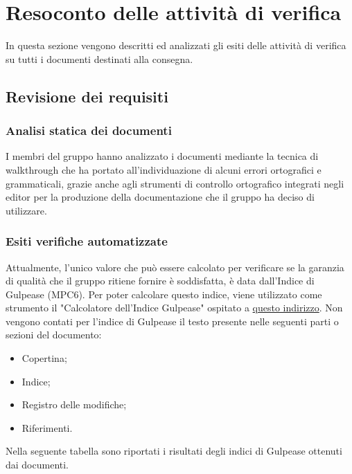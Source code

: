 \section{Resoconto delle attività di verifica}
In questa sezione vengono descritti ed analizzati gli esiti delle attività di verifica su tutti i documenti destinati alla consegna.

\subsection{Revisione dei requisiti}

\subsubsection{Analisi statica dei documenti}
I membri del gruppo \Gruppo{} hanno analizzato i documenti mediante la tecnica di walkthrough che ha portato all'individuazione di 
alcuni errori ortografici e grammaticali, grazie anche agli strumenti di controllo ortografico integrati negli editor per la produzione
della documentazione che il gruppo ha deciso di utilizzare.

\subsubsection{Esiti verifiche automatizzate}
Attualmente, l'unico valore che può essere calcolato per verificare se la garanzia di qualità che il gruppo ritiene fornire è
soddisfatta, è data dall'Indice di Gulpease (MPC6).
Per poter calcolare questo indice, viene utilizzato come strumento il "Calcolatore dell'Indice Gulpease" ospitato a \href{https://farfalla-project.org/readability_static/}{questo indirizzo}.
Non vengono contati per l'indice di Gulpease il testo presente nelle seguenti parti o sezioni del documento:
\begin{itemize}
    \item Copertina;
    \item Indice;
    \item Registro delle modifiche;
    \item Riferimenti.
\end{itemize}
Nella seguente tabella sono riportati i risultati degli indici di Gulpease ottenuti dai documenti.

